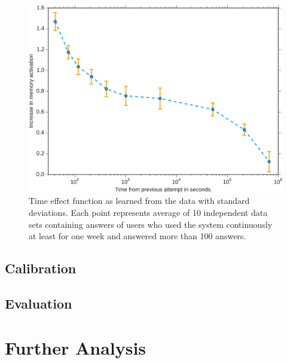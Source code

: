 \begin{figure}[htbp]
  \centering
  \includegraphics[width=\textwidth]{img/learned-time-effect-function}
  \caption{Time effect function as learned from the data with standard deviations. Each point represents average of 10 independent data sets containing answers of users who used the system continuously at least for one week and answered more than 100 answers.}
  \label{learned-time-effect-function}
\end{figure}

\subsection*{Calibration}

\subsection{Evaluation}
\label{evaluation}

\section{Further Analysis}
\label{further-analysis}
